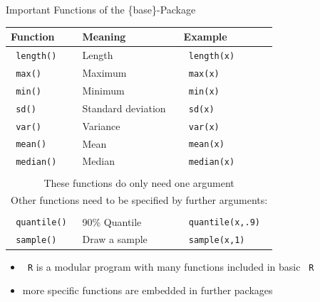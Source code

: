 \documentclass[11pt,german,hideothersubsections]{beamer}\usepackage[]{graphicx}\usepackage[]{color}
\newcommand{\R}[1]{{\tt \color{blue}  #1}}
\begin{document}
\begin{frame}[fragile]{Important Functions} {of the \{base\}-Package}
\begin{center}
\renewcommand{\arraystretch}{.75}
\begin{tabular}{lll}
Function & Meaning & Example \\
\hline
\R{length()} & Length & \R{length(x)}\\
\R{max()} & Maximum & \R{max(x)}\\
\R{min()} & Minimum & \R{min(x)}\\
\R{sd()} & Standard deviation & \R{sd(x)}\\
\R{var()} & Variance & \R{var(x)}\\
\R{mean()} & Mean & \R{mean(x)} \\
\R{median()} & Median & \R{median(x)} \\
&& \\
\multicolumn{3}{c}{These functions do only need one argument}\\
\multicolumn{3}{c}{Other functions need to be specified by further arguments:}\\
&& \\
\R{quantile()} & 90\% Quantile & \R{quantile(x,.9)}\\ 
\R{sample()} & Draw a sample & \R{sample(x,1)}\\
\end{tabular}
\end{center}
\begin{itemize}
\pause\item \R{R} is a modular program with many functions included in basic \R{R}
\pause\item more specific functions are embedded in further packages
\end{itemize}
\end{frame}
\end{document}
